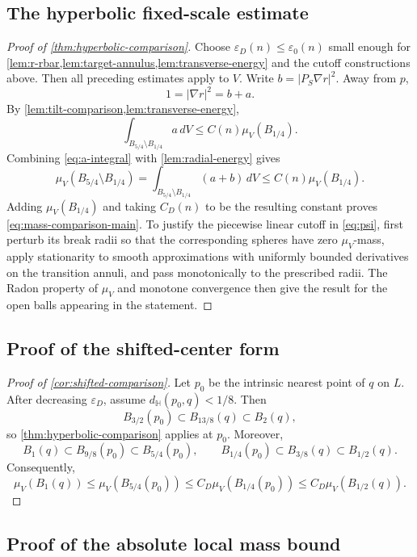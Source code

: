 \documentclass[11pt,reqno]{amsart}
\numberwithin{equation}{section}
\theoremstyle{definition}
\theoremstyle{remark}
\newcommand{\Hyp}{\mathbb H}
\newcommand{\eps}{\varepsilon}
\begin{document}
\subsection{The hyperbolic fixed-scale estimate}

\begin{proof}[Proof of \cref{thm:hyperbolic-comparison}]
Choose $\eps_D(n)\le\eps_0(n)$ small enough for
\cref{lem:r-rbar,lem:target-annulus,lem:transverse-energy} and the cutoff
constructions above.  Then all preceding estimates apply to $V$.
Write $b=|P_S\nabla r|^2$.  Away from $p$,
\[
 1=|\nabla r|^2=b+a.
\]
By \cref{lem:tilt-comparison,lem:transverse-energy},
\begin{equation}\label{eq:a-integral}
 \int_{B_{5/4}\setminus B_{1/4}}a\,dV
 \le C(n)\mu_V(B_{1/4}).
\end{equation}
Combining \eqref{eq:a-integral} with \cref{lem:radial-energy} gives
\[
 \mu_V(B_{5/4}\setminus B_{1/4})
 =\int_{B_{5/4}\setminus B_{1/4}}(a+b)\,dV
 \le C(n)\mu_V(B_{1/4}).
\]
Adding $\mu_V(B_{1/4})$ and taking $C_D(n)$ to be the resulting constant
proves \eqref{eq:mass-comparison-main}.  To justify the
piecewise linear cutoff in \eqref{eq:psi}, first perturb its break radii so
that the corresponding spheres have zero $\mu_V$-mass, apply stationarity to
smooth approximations with uniformly bounded derivatives on the transition
annuli, and pass monotonically to the prescribed radii.  The Radon property
of $\mu_V$ and monotone convergence then give the result for the open balls
appearing in the statement.
\end{proof}

\subsection{Proof of the shifted-center form}

\begin{proof}[Proof of \cref{cor:shifted-comparison}]
Let $p_0$ be the intrinsic nearest point of $q$ on $L$.  After decreasing
$\eps_D$, assume $d_{\Hyp}(p_0,q)<1/8$.  Then
\[
 B_{3/2}(p_0)\subset B_{13/8}(q)\subset B_2(q),
\]
so \cref{thm:hyperbolic-comparison} applies at $p_0$.  Moreover,
\[
 B_1(q)\subset B_{9/8}(p_0)\subset B_{5/4}(p_0),
 \qquad
 B_{1/4}(p_0)\subset B_{3/8}(q)\subset B_{1/2}(q).
\]
Consequently,
\[
 \mu_V(B_1(q))
 \le\mu_V(B_{5/4}(p_0))
 \le C_D\mu_V(B_{1/4}(p_0))
 \le C_D\mu_V(B_{1/2}(q)).
\]
\end{proof}

\subsection{Proof of the absolute local mass bound}
\end{document}
